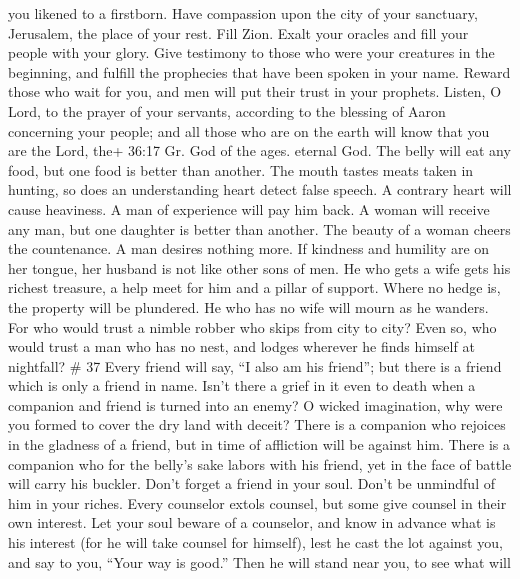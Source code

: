 you likened to a firstborn.  Have compassion upon the city
of your sanctuary, Jerusalem, the place of your rest.  Fill
Zion. Exalt your oracles and fill your people with your glory.
 Give testimony to those who were your creatures in the
beginning, and fulfill the prophecies that have been spoken in your
name.  Reward those who wait for you, and men will put
their trust in your prophets.  Listen, O Lord, to the
prayer of your servants, according to the blessing of Aaron concerning
your people; and all those who are on the earth will know that you are
the Lord, the+ 36:17 Gr. God of the ages. eternal God.  The
belly will eat any food, but one food is better than another.
 The mouth tastes meats taken in hunting, so does an
understanding heart detect false speech.  A contrary heart
will cause heaviness. A man of experience will pay him back.
 A woman will receive any man, but one daughter is better
than another.  The beauty of a woman cheers the
countenance. A man desires nothing more.  If kindness and
humility are on her tongue, her husband is not like other sons of men.
 He who gets a wife gets his richest treasure, a help meet
for him and a pillar of support.  Where no hedge is, the
property will be plundered. He who has no wife will mourn as he wanders.
 For who would trust a nimble robber who skips from city to
city? Even so, who would trust a man who has no nest, and lodges
wherever he finds himself at nightfall? \# 37  Every friend
will say, ``I also am his friend''; but there is a friend which is only
a friend in name.  Isn't there a grief in it even to death
when a companion and friend is turned into an enemy?  O
wicked imagination, why were you formed to cover the dry land with
deceit?  There is a companion who rejoices in the gladness
of a friend, but in time of affliction will be against him. 
There is a companion who for the belly's sake labors with his friend,
yet in the face of battle will carry his buckler.  Don't
forget a friend in your soul. Don't be unmindful of him in your riches.
 Every counselor extols counsel, but some give counsel in
their own interest.  Let your soul beware of a counselor,
and know in advance what is his interest (for he will take counsel for
himself), lest he cast the lot against you,  and say to you,
``Your way is good.'' Then he will stand near you, to see what will

